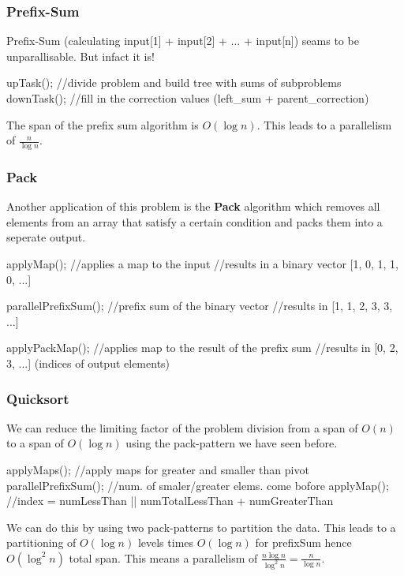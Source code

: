\subsubsection{Prefix-Sum}

\begin{remark}
    Prefix-Sum (calculating input[1] + input[2] + ... + input[n]) seams to be unparallisable. But infact it is!
\end{remark}

\begin{algorithm}
upTask(); //divide problem and build tree with sums of subproblems
downTask(); //fill in the correction values (left_sum + parent_correction)
\end{algorithm}

\begin{theorem}
    The span of the prefix sum algorithm is $O(\log n)$. This leads to a parallelism of $\frac{n}{\log n}$.
\end{theorem}

\subsubsection{Pack}

Another application of this problem is the \textbf{Pack} algorithm which removes all elements from an array that satisfy a certain condition and packs them into a seperate output.

\begin{algorithm}
applyMap(); //applies a map to the input
//results in a binary vector [1, 0, 1, 1, 0, ...]

parallelPrefixSum(); //prefix sum of the binary vector
//results in [1, 1, 2, 3, 3, ...]

applyPackMap(); //applies map to the result of the prefix sum
//results in [0, 2, 3, ...] (indices of output elements)
\end{algorithm}

\subsubsection{Quicksort}

We can reduce the limiting factor of the problem division from a span of $O(n)$ to a span of $O(\log n)$
using the pack-pattern we have seen before.

\begin{algorithm}
applyMaps(); //apply maps for greater and smaller than pivot
parallelPrefixSum(); //num. of smaler/greater elems. come bofore
applyMap(); //index = numLessThan || numTotalLessThan + numGreaterThan
\end{algorithm}

We can do this by using two pack-patterns to partition the data. This leads to a partitioning of $O(\log n)$
levels times $O(\log n)$ for prefixSum hence $O(\log^2 n)$ total span. This means a parallelism of 
$\frac{n \log n}{\log^2 n} = \frac{n}{\log n}$.

        
